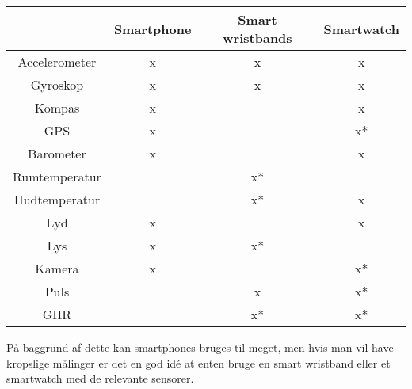 \begin{table}
\centering
\begin{tabular}{|c|c|c|c|}
\hline  			 & Smartphone 	& Smart wristbands 	& Smartwatch 	\\ 
\hline Accelerometer &  x		  	&  			x	 	&  		x  		\\ 
\hline Gyroskop		 &	x			&			x		&		x		\\
\hline Kompas		 &  x			&					&		x		\\
\hline GPS			 &	x			&					&		x*		\\
\hline Barometer	 &	x			&					&		x		\\
\hline Rumtemperatur &				&			x*		&				\\
\hline Hudtemperatur &				&			x*		&		x		\\
\hline Lyd			 &	x			&					&		x		\\
\hline Lys			 &	x			&			x*		&				\\
\hline Kamera		 &	x			&					&		x*		\\
\hline Puls			 &				&			x		&		x*		\\
\hline GHR			 &				&			x*		&		x*		\\ \hline
\end{tabular}
\label{tab:sensorsInDevices}
\end{table}

På baggrund af dette kan smartphones bruges til meget, men hvis man vil have kropslige målinger er det en god idé at enten bruge en smart wristband eller et smartwatch med de relevante sensorer.